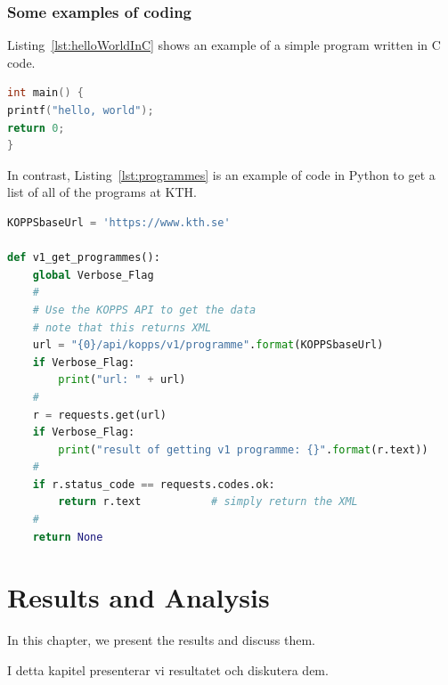 \documentclass[english]{kththesis}
\newenvironment{swedishnotes}%
  {\begin{center}
      \selectlanguage{swedish}
      \color{blue}}%
    {\end{center}\selectlanguage{english}
    }
\begin{document}
\subsection{Some examples of coding}

Listing~\ref{lst:helloWorldInC} shows an example of a simple program written
in C code.

\begin{lstlisting}[language={C}, caption={Hello world in C code}, label=lst:helloWorldInC]
int main() {
printf("hello, world");
return 0;
}
\end{lstlisting}


In contrast, Listing~\ref{lst:programmes} is an example of code in Python to
get a list of all of the programs at KTH.

\lstset{extendedchars=true}
\begin{lstlisting}[language={Python}, caption={Using a python program to
    access the KTH API to get all of the programs at KTH}, label=lst:programmes]
KOPPSbaseUrl = 'https://www.kth.se'

def v1_get_programmes():
    global Verbose_Flag
    #
    # Use the KOPPS API to get the data
    # note that this returns XML
    url = "{0}/api/kopps/v1/programme".format(KOPPSbaseUrl)
    if Verbose_Flag:
        print("url: " + url)
    #
    r = requests.get(url)
    if Verbose_Flag:
        print("result of getting v1 programme: {}".format(r.text))
    #
    if r.status_code == requests.codes.ok:
        return r.text           # simply return the XML
    #
    return None
\end{lstlisting}


\cleardoublepage
\chapter{Results and Analysis}
\label{ch:resultsAndAnalysis}

In this chapter, we present the results and discuss them.

\begin{swedishnotes}
I detta kapitel presenterar vi resultatet och diskutera dem.
\end{swedishnotes}
\end{document}
